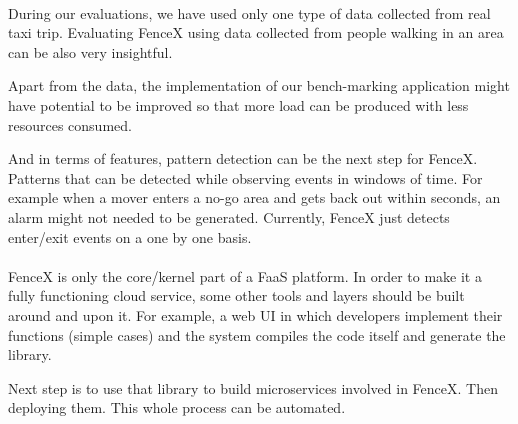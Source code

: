 \documentclass[a4]{report}
\begin{document}
    \paragraph{}
    During our evaluations, we have used only one type of data collected from real taxi trip.
    Evaluating FenceX using data collected from people walking in an area can be also very insightful.

    Apart from the data, the implementation of our bench-marking application might have potential to be improved so
    that more load can be produced with less resources consumed.

    And in terms of features, pattern detection can be the next step for FenceX.
    Patterns that can be detected while observing events in windows of time.
    For example when a mover enters a no-go area and gets back out within seconds, an alarm might not needed to be
    generated.
    Currently, FenceX just detects enter/exit events on a one by one basis.

    \paragraph{}
    FenceX is only the core/kernel part of a FaaS platform.
    In order to make it a fully functioning cloud service, some other tools and layers should be built around and
    upon it.
    For example, a web UI in which developers implement their functions (simple cases) and the system compiles
    the code itself and generate the library.

    Next step is to use that library to build microservices involved in FenceX.
    Then deploying them.
    This whole process can be automated.

    \nocite{*}
    
    
\end{document}
